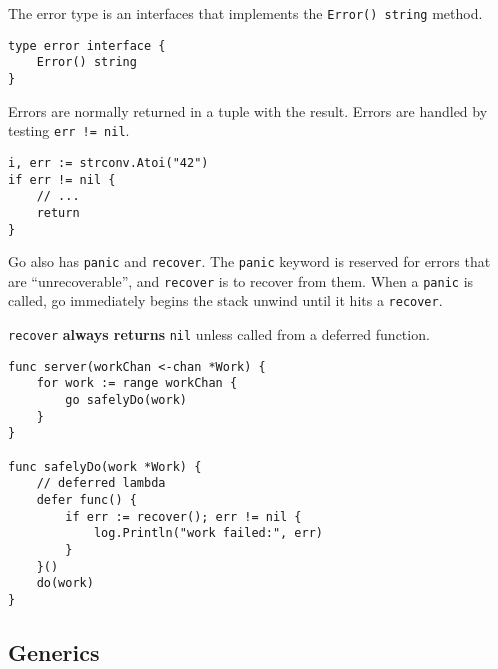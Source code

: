 \documentclass{article}
\begin{document}
\begin{paracol}{2}

The error type is an interfaces that implements the \lstinline|Error() string| method. 

\switchcolumn

\begin{lstlisting}
type error interface {
    Error() string
}
\end{lstlisting}

\switchcolumn*

Errors are normally returned in a tuple with the result. Errors are handled by testing \lstinline|err != nil|.

\switchcolumn

\begin{lstlisting}
i, err := strconv.Atoi("42")
if err != nil {
    // ...
    return
}
\end{lstlisting}

\switchcolumn*

\noindent Go also has \lstinline|panic| and \lstinline|recover|. The \lstinline|panic| keyword is reserved for errors that are ``unrecoverable'', and \lstinline|recover| is to recover from them. When a \lstinline|panic| is called, go immediately begins the stack unwind until it hits a \lstinline|recover|.

\lstinline{recover} \textbf{always returns} \lstinline|nil| unless called from a deferred function.

\switchcolumn

\begin{lstlisting}
func server(workChan <-chan *Work) {
    for work := range workChan {
        go safelyDo(work)
    }
}

func safelyDo(work *Work) {
    // deferred lambda
    defer func() {
        if err := recover(); err != nil {
            log.Println("work failed:", err)
        }
    }()
    do(work)
}
\end{lstlisting}

\end{paracol}

\subsection{Generics}\label{sec:generics}
\end{document}
